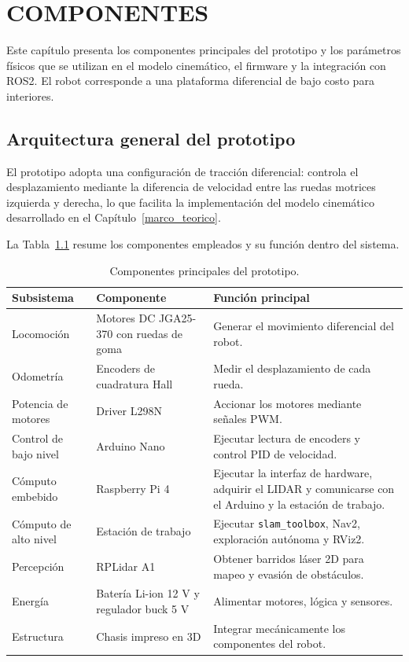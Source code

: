 \chapter{COMPONENTES}
\label{ch:componentes}

Este capítulo presenta los componentes principales del prototipo y los parámetros físicos que se utilizan en el modelo cinemático, el firmware y la integración con \gls{ROS2}. El robot corresponde a una plataforma diferencial de bajo costo para interiores.

\section{Arquitectura general del prototipo}

El prototipo adopta una configuración de tracción diferencial: controla el desplazamiento mediante la diferencia de velocidad entre las ruedas motrices izquierda y derecha, lo que facilita la implementación del modelo cinemático desarrollado en el Capítulo~\ref{marco_teorico}.

La Tabla~\ref{tab:componentes_principales} resume los componentes empleados y su función dentro del sistema.

\begin{table}[H]
\centering
\caption{Componentes principales del prototipo.}
\label{tab:componentes_principales}
\small
\begin{tabular}{p{3.2cm} p{4.5cm} p{5.2cm}}
\toprule
\textbf{Subsistema} & \textbf{Componente} & \textbf{Función principal} \\
\midrule
Locomoción & Motores DC JGA25-370 con ruedas de goma & Generar el movimiento diferencial del robot. \\
Odometría & Encoders de cuadratura Hall & Medir el desplazamiento de cada rueda. \\
Potencia de motores & Driver L298N & Accionar los motores mediante señales \gls{PWM}. \\
Control de bajo nivel & \gls{Arduino} Nano & Ejecutar lectura de encoders y control PID de velocidad. \\
Cómputo embebido & Raspberry Pi 4 & Ejecutar la interfaz de hardware, adquirir el \gls{LIDAR} y comunicarse con el \gls{Arduino} y la estación de trabajo. \\
Cómputo de alto nivel & Estación de trabajo & Ejecutar \texttt{slam\_toolbox}, Nav2, exploración autónoma y RViz2. \\
Percepción & RPLidar A1 & Obtener barridos láser 2D para mapeo y evasión de obstáculos. \\
Energía & Batería Li-ion 12 V y regulador buck 5 V & Alimentar motores, lógica y sensores. \\
Estructura & Chasis impreso en 3D & Integrar mecánicamente los componentes del robot. \\
\bottomrule
\end{tabular}
\end{table}

